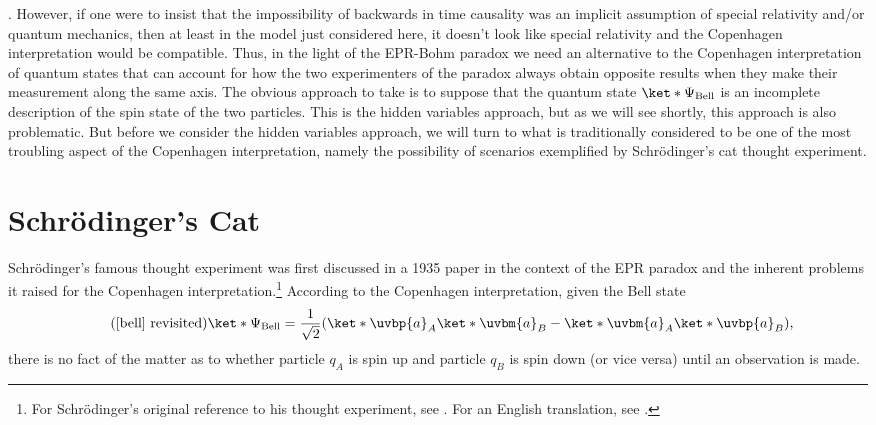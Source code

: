 \documentclass[12pt]{report}
\providecommand{\DIFaddend}{} %
\begin{document}
{{. However, if one were to insist that the impossibility of backwards in time causality was an implicit assumption of special relativity and/or quantum mechanics, then at least in the model just considered here, it doesn't look like special relativity and the Copenhagen interpretation would be compatible.}} \DIFaddend Thus, in the light of the EPR-Bohm paradox we need an alternative to the Copenhagen interpretation of quantum states that can account for how the two experimenters of the paradox always obtain opposite results when they make their measurement along the same axis. The obvious approach to take is to suppose that the quantum state $\ket*{\Psi_{\text{Bell}}}$ is an incomplete description of the spin state of the two particles. This is the hidden variables approach, but as we will see shortly, this approach is also problematic. But before we consider the hidden variables approach, we will turn to what is traditionally considered to be one of the most troubling aspect of the Copenhagen interpretation, namely the possibility of scenarios exemplified by Schr\"{o}dinger's cat thought experiment.



\section{Schr\"{o}dinger's Cat\label{SchrondingersCat}}
Schr\"{o}dinger's famous thought experiment was first discussed in a 1935 paper in the context of the EPR paradox and the inherent problems it raised for the Copenhagen interpretation.\footnote{For Schr\"{o}dinger's original reference to his thought experiment, see \cite{SchrondingerOrig}. For an English translation, see \cite{SchrondingerEnglish}.} According to the Copenhagen interpretation, given the Bell state 
\begin{equation}\tag{\ref{bell} revisited}
    \ket*{\Psi_{\text{Bell}}}=\frac{1}{\sqrt{2}}(\ket*{\uvbp{a}}_A\ket*{\uvbm{a}}_B-\ket*{\uvbm{a}}_A\ket*{\uvbp{a}}_B),
\end{equation}
there is no fact of the matter as to whether particle $q_A$ is spin up and particle $q_B$ is spin down (or vice versa) until an observation is made.  
\end{document}

